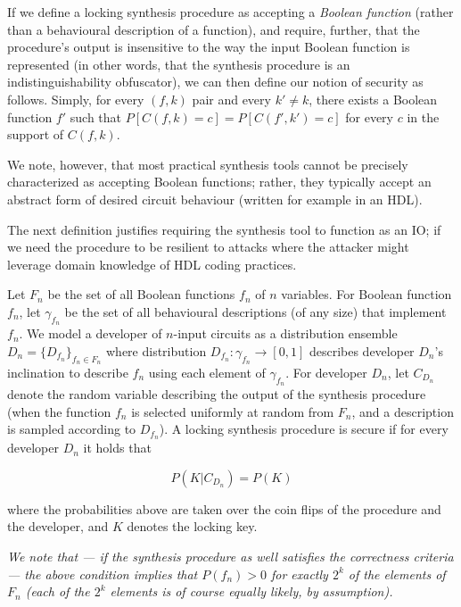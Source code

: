 \begin{definition}
If we define a locking synthesis procedure as accepting a \emph{Boolean function} (rather than a behavioural description of a function), and require, further, that the procedure's output is insensitive to the way the input Boolean function is represented (in other words, that the synthesis procedure is an indistinguishability obfuscator), we can then define our notion of security as follows. Simply, for every $(f,k)$ pair and every $k'\neq k$, there exists a Boolean function $f'$ such that $P[C(f,k)=c]=P[C(f',k')=c]$ for every $c$ in the support of $C(f,k)$.
\end{definition}

 We note, however, that most practical synthesis tools cannot be precisely characterized as accepting Boolean functions; rather, they typically accept an abstract form of desired circuit behaviour (written for example in an HDL). 
 
 The next definition justifies requiring the synthesis tool to function as an IO; if we need the procedure to be resilient to attacks where the attacker might leverage domain knowledge of HDL coding practices.

\begin{definition} Let $F_n$ be the set of all Boolean functions $f_n$ of $n$ variables. For Boolean function $f_n$, let $\gamma_{f_n}$ be the set of all behavioural descriptions (of any size) that implement $f_n$. We model a developer of $n$-input circuits as a distribution ensemble $D_n=\{D_{f_n}\}_{f_n\in F_n}$ where distribution $D_{f_n}:\gamma_{f_n}\rightarrow [0,1]$ describes developer $D_n$'s inclination to describe $f_n$ using each element of $\gamma_{f_n}$. For developer $D_n$, let $C_{D_n}$ denote the random variable describing the output of the synthesis procedure (when the function $f_n$ is selected uniformly at random from $F_n$, and a description is sampled according to $D_{f_n}$). A locking synthesis procedure is secure if for every developer $D_n$ it holds that

$$ P(K|C_{D_n})=P(K) $$

where the probabilities above are taken over the coin flips of the procedure and the developer, and $K$ denotes the locking key.
\end{definition}

\emph{We note that --- if the synthesis procedure as well satisfies the correctness criteria --- the above condition implies that $P(f_n)>0$ for exactly $2^k$ of the elements of $F_n$ (each of the $2^k$ elements is of course equally likely, by assumption).}

